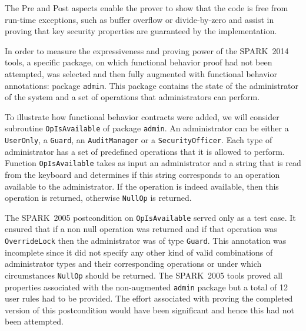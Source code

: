 \documentclass[10pt,a4paper,twocolumn]{article}
\newcommand{\oldspark}{SPARK~2005\xspace}
\newcommand{\newspark}{SPARK~2014\xspace}
\newcommand{\eg}{\textit{e.g.}\xspace}
\begin{document}
The Pre and Post aspects enable the prover to show that the code is
free from run-time exceptions, such as buffer overflow or
divide-by-zero and assist in proving that key security properties are
guaranteed by the implementation.

In order to measure the expressiveness and proving power of the
\newspark tools, a specific package, on which functional behavior
proof had not been attempted, was selected and then fully augmented
with functional behavior annotations: package \verb|admin|.
This package contains the state of the
administrator of the system and a set of operations that
administrators can perform.

To illustrate how functional behavior contracts were added, we will
consider subroutine \verb|OpIsAvailable| of package \verb|admin|. An
administrator can be either a \verb|UserOnly|, a \verb|Guard|, an
\verb|AuditManager| or a \verb|SecurityOfficer|. Each type of
administrator has a set of predefined operations that it is allowed to
perform. Function \verb|OpIsAvailable| takes as input an administrator
and a string that is read from the keyboard and determines if this
string corresponds to an operation available to the administrator. If
the operation is indeed available, then this operation is returned,
otherwise \verb|NullOp| is returned.

The \oldspark postcondition on \verb|OpIsAvailable| served only as a
test case. It ensured that if a non null operation was returned and if
that operation was \verb|OverrideLock| then the administrator was of
type \verb|Guard|. This annotation was incomplete since it did not
specify any other kind of valid combinations of administrator types
and their corresponding operations
or under which circumstances \verb|NullOp| should be returned.  The
\oldspark tools proved all properties associated with the
non-augmented \verb|admin| package but a total of 12 user rules had to
be provided. The effort associated with proving the completed version
of this postcondition would have been significant and hence this had
not been attempted.
\end{document}
